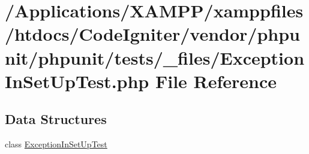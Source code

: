 \hypertarget{_exception_in_set_up_test_8php}{}\section{/\+Applications/\+X\+A\+M\+P\+P/xamppfiles/htdocs/\+Code\+Igniter/vendor/phpunit/phpunit/tests/\+\_\+files/\+Exception\+In\+Set\+Up\+Test.php File Reference}
\label{_exception_in_set_up_test_8php}
\subsection*{Data Structures}
\begin{DoxyCompactItemize}
\item 
class \mbox{\hyperlink{class_exception_in_set_up_test}{Exception\+In\+Set\+Up\+Test}}
\end{DoxyCompactItemize}
